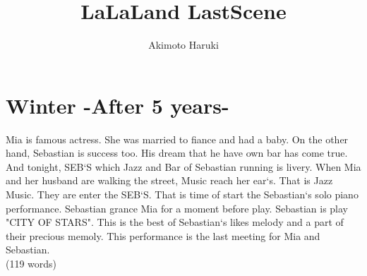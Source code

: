 \documentclass{article}
\title{LaLaLand LastScene}
\author{Akimoto Haruki}
\begin{document}
  \maketitle


  \section{Winter -After 5 years-}
    Mia is famous actress. She was married to fiance and had a baby. On the other hand, Sebastian is success too.
    His dream that he have own bar has come true. And tonight, SEB`S which Jazz and Bar of Sebastian running is livery.
    When Mia and her husband are walking the street,
    Music reach her ear`s. That is Jazz Music.
    They are enter the SEB`S.
    That is time of start the Sebastian`s solo piano performance.
    Sebastian grance Mia for a moment before play.
    Sebastian is play "CITY OF STARS".
    This is the best of Sebastian`s likes melody and a part of their precious memoly.
    This performance is the last meeting for Mia and Sebastian.
    \\(119 words)
\end{document}
